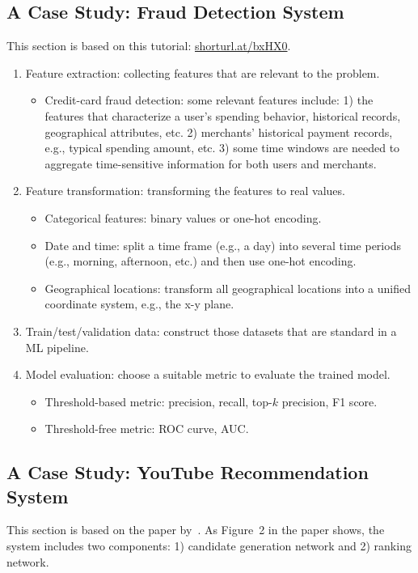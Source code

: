 

\subsection{A Case Study: Fraud Detection System}
    This section is based on this tutorial: \url{shorturl.at/bxHX0}.
    \begin{enumerate}
        \item Feature extraction: collecting features that are relevant to the problem.
            \begin{itemize}
                \item Credit-card fraud detection: some relevant features include: 1) the features that characterize a user's spending behavior, historical records, geographical attributes, etc. 2) merchants' historical payment records, e.g., typical spending amount, etc. 3) some time windows are needed to aggregate time-sensitive information for both users and merchants. 
            \end{itemize}
        \item Feature transformation: transforming the features to real values.
            \begin{itemize}
                \item Categorical features: binary values or one-hot encoding. 
                \item Date and time: split a time frame (e.g., a day) into several time periods (e.g., morning, afternoon, etc.) and then use one-hot encoding. 
                \item Geographical locations: transform all geographical locations into a unified coordinate system, e.g., the x-y plane.
            \end{itemize}
        \item Train/test/validation data: construct those datasets that are standard in a ML pipeline. 
        \item Model evaluation: choose a suitable metric to evaluate the trained model.
            \begin{itemize}
                \item Threshold-based metric: precision, recall, top-$k$ precision, F1 score.
                \item Threshold-free metric: ROC curve, AUC.
            \end{itemize}
    \end{enumerate}
    
    
\subsection{A Case Study: YouTube Recommendation System}
    This section is based on the paper by~\citet{covington2016deep}.
    As Figure~2 in the paper shows, the system includes two components: 1) candidate generation network and 2) ranking network.
